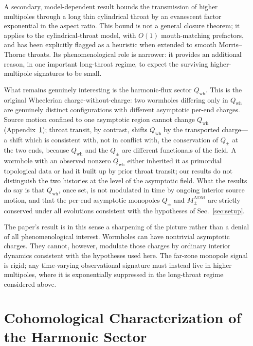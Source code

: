 \documentclass[aps,prd,onecolumn,nofootinbib,superscriptaddress]{revtex4-2}
\begin{document}
A secondary, model-dependent result bounds the transmission of higher multipoles through a long thin cylindrical throat by an evanescent factor exponential in the aspect ratio. This bound is not a general closure theorem; it applies to the cylindrical-throat model, with $O(1)$ mouth-matching prefactors, and has been explicitly flagged as a heuristic when extended to smooth Morris--Thorne throats. Its phenomenological role is narrower: it provides an additional reason, in one important long-throat regime, to expect the surviving higher-multipole signatures to be small.

What remains genuinely interesting is the harmonic-flux sector $Q_{\mathrm{wh}}$. This is the original Wheelerian charge-without-charge: two wormholes differing only in $Q_{\mathrm{wh}}$ are genuinely distinct configurations with different asymptotic per-end charges. Source motion confined to one asymptotic region cannot change $Q_{\mathrm{wh}}$ (Appendix~\ref{app:cohomology}); throat transit, by contrast, shifts $Q_{\mathrm{wh}}$ by the transported charge---a shift which is consistent with, not in conflict with, the conservation of $Q_\pm$ at the two ends, because $Q_{\mathrm{wh}}$ and the $Q_\pm$ are different functionals of the field. A wormhole with an observed nonzero $Q_{\mathrm{wh}}$ either inherited it as primordial topological data or had it built up by prior throat transit; our results do not distinguish the two histories at the level of the asymptotic field. What the results do say is that $Q_{\mathrm{wh}}$, once set, is not modulated in time by ongoing interior source motion, and that the per-end asymptotic monopoles $Q_\pm$ and $M^{\mathrm{ADM}}_\pm$ are strictly conserved under all evolutions consistent with the hypotheses of Sec.~\ref{sec:setup}.

The paper's result is in this sense a sharpening of the picture rather than a denial of all phenomenological interest. Wormholes can have nontrivial asymptotic charges. They cannot, however, modulate those charges by ordinary interior dynamics consistent with the hypotheses used here. The far-zone monopole signal is rigid; any time-varying observational signature must instead live in higher multipoles, where it is exponentially suppressed in the long-throat regime considered above.

\appendix

\section{Cohomological Characterization of the Harmonic Sector}
\label{app:cohomology}
\end{document}
